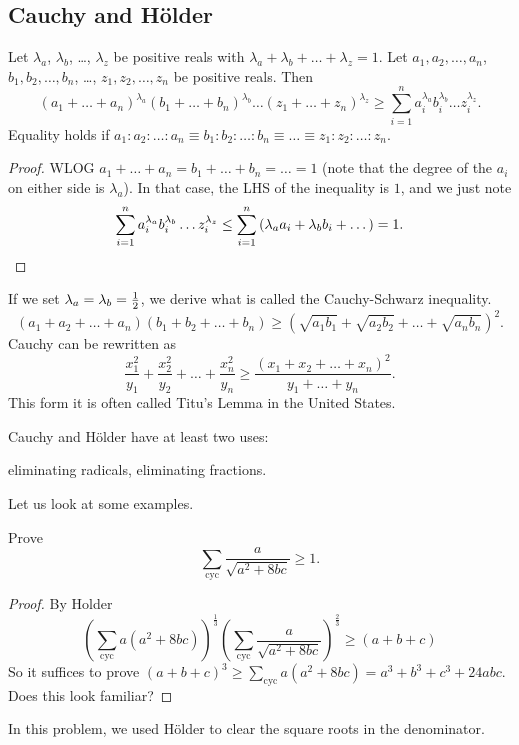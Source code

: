 \documentclass[11pt]{scrartcl}
\begin{document}
\subsection{Cauchy and H\"older}
\begin{theorem}
	Let $\lambda_a$, $\lambda_b$, \dots, $\lambda_z$ be positive reals with $\lambda_a + \lambda_b + \dots + \lambda_z = 1$. Let $a_1, a_2, \dots, a_n$, $b_1, b_2, \dots, b_n$, \dots, $z_1, z_2, \dots, z_n$ be positive reals.
	Then
	\[ \left( a_1+\dots+a_n \right)^{\lambda_a}
		\left( b_1+\dots+b_n \right)^{\lambda_b}
		\dots
		\left( z_1+\dots+z_n \right)^{\lambda_z}
		\ge \sum_{i=1}^n a_i^{\lambda_a} b_i^{\lambda_b} \dots z_i^{\lambda_z}. \]
	Equality holds if $a_1 : a_2 : \dots : a_n \equiv b_1 : b_2 : \dots : b_n \equiv \dots \equiv z_1 : z_2 : \dots : z_n$.
\end{theorem}
\begin{proof}
	WLOG $a_1+\dots+a_n = b_1+\dots+b_n = \dots = 1$
	(note that the degree of the $a_i$ on either side is $\lambda_a$).
	In that case, the LHS of the inequality is $1$, and we just note
	\[ \sum_{i=1}^n a_i^{\lambda_a} b_i^{\lambda_b} \dots z_i^{\lambda_z}
		\le \sum_{i=1}^n \left( \lambda_a a_i + \lambda_b b_i + \dots \right)
		= 1. \qedhere \]
\end{proof}
If we set $\lambda_a = \lambda_b = \frac{1}{2}$, we derive what is called the Cauchy-Schwarz inequality.
\[ \left( a_1+a_2+\dots+a_n \right)\left( b_1+b_2+\dots+b_n \right)
	\ge \left( \sqrt{a_1 b_1} + \sqrt{a_2 b_2} + \dots + \sqrt{a_n b_n} \right)^2. \]
Cauchy can be rewritten as
\[ \frac{x_1^2}{y_1} + \frac{x_2^2}{y_2} + \dots + \frac{x_n^2}{y_n} \ge \frac{\left( x_1+x_2+\dots+x_n \right)^2}{y_1+\dots+y_n}. \]
This form it is often called Titu's Lemma in the United States.

Cauchy and H\"older have at least two uses:
\begin{enumerate}
	\ii eliminating radicals,
	\ii eliminating fractions.
\end{enumerate}

Let us look at some examples.
\begin{example}
	[IMO 2001] Prove \[ \sum_{\text{cyc}} \frac{a}{\sqrt{a^2+8bc}} \ge 1. \]
\end{example}
\begin{proof}
	By Holder
	\[ 
		\left( \sum_{\text{cyc}} a(a^2+8bc) \right)^{\frac13} 
		\left( \sum_{\text{cyc}} \frac{a}{\sqrt{a^2+8bc}} \right)^{\frac 23}
		\ge \left( a+b+c \right)
	\]
	So it suffices to prove $(a+b+c)^3 \ge \sum_{\text{cyc}} a(a^2+8bc) = a^3+b^3+c^3+24abc$. Does this look familiar?
\end{proof}
In this problem, we used H\"older to clear the square roots in the denominator.
\end{document}
